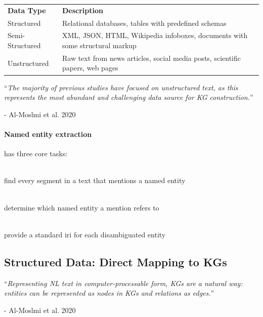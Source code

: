 \begin{mytable}
    \begin{tabular}{p{} p{}}
        \textbf{Data Type} & \textbf{Description}                                                          \\
        Structured         & Relational databases, tables with predefined schemas                          \\

        Semi-Structured    & XML, JSON, HTML, Wikipedia infoboxes, documents with some structural markup   \\

        Unstructured       & Raw text from news articles, social media posts, scientific papers, web pages \\
    \end{tabular}
    \caption{The three types of data sources for knowledge graph construction.}
    \label{tab:data_types}
\end{mytable}

\begin{challenge}
    ``\textit{The majority of previous studies have focused on unstructured text, as this represents the
    most abundant and challenging data source for KG construction.}''
\end{challenge}
- Al-Moslmi et al. 2020

\paragraph{Named entity extraction} has three core tasks:

\begin{bsp}
     \\
    find every segment in a text that
    mentions a named entity
\end{bsp}

\begin{bsp}
     \\
    determine which named entity a
    mention refers to
\end{bsp}

\begin{bsp}
     \\
    provide a standard \gls{iri} for each
    disambiguated entity
\end{bsp}

\subsection*{Structured Data: Direct Mapping to KGs}
\begin{center}
    ``\textit{Representing NL text in computer-processable form, KGs are a natural way: entities
    can be represented as nodes in KGs and relations as edges.}''
\end{center}
- Al-Moslmi et al. 2020

